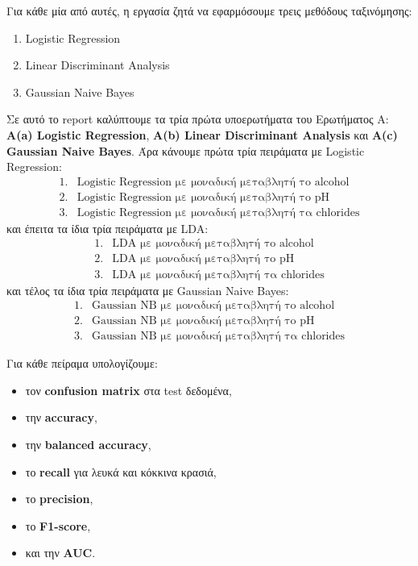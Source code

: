 \documentclass[11pt,a4paper]{article}
\begin{document}
Για κάθε μία από αυτές, η εργασία ζητά να εφαρμόσουμε τρεις μεθόδους
ταξινόμησης:
\begin{enumerate}
    \item Logistic Regression
    \item Linear Discriminant Analysis
    \item Gaussian Naive Bayes
\end{enumerate}

Σε αυτό το report καλύπτουμε τα τρία πρώτα υποερωτήματα του Ερωτήματος Α:
\textbf{Α(a) Logistic Regression}, \textbf{Α(b) Linear Discriminant
Analysis} και \textbf{Α(c) Gaussian Naive Bayes}. Άρα κάνουμε πρώτα τρία
πειράματα με Logistic Regression:
\[
\begin{array}{ll}
1. & \text{Logistic Regression με μοναδική μεταβλητή το alcohol} \\
2. & \text{Logistic Regression με μοναδική μεταβλητή το pH} \\
3. & \text{Logistic Regression με μοναδική μεταβλητή τα chlorides}
\end{array}
\]
και έπειτα τα ίδια τρία πειράματα με LDA:
\[
\begin{array}{ll}
1. & \text{LDA με μοναδική μεταβλητή το alcohol} \\
2. & \text{LDA με μοναδική μεταβλητή το pH} \\
3. & \text{LDA με μοναδική μεταβλητή τα chlorides}
\end{array}
\]
και τέλος τα ίδια τρία πειράματα με Gaussian Naive Bayes:
\[
\begin{array}{ll}
1. & \text{Gaussian NB με μοναδική μεταβλητή το alcohol} \\
2. & \text{Gaussian NB με μοναδική μεταβλητή το pH} \\
3. & \text{Gaussian NB με μοναδική μεταβλητή τα chlorides}
\end{array}
\]

Για κάθε πείραμα υπολογίζουμε:
\begin{itemize}
    \item τον \textbf{confusion matrix} στα test δεδομένα,
    \item την \textbf{accuracy},
    \item την \textbf{balanced accuracy},
    \item το \textbf{recall} για λευκά και κόκκινα κρασιά,
    \item το \textbf{precision},
    \item το \textbf{F1-score},
    \item και την \textbf{AUC}.
\end{itemize}
\end{document}
